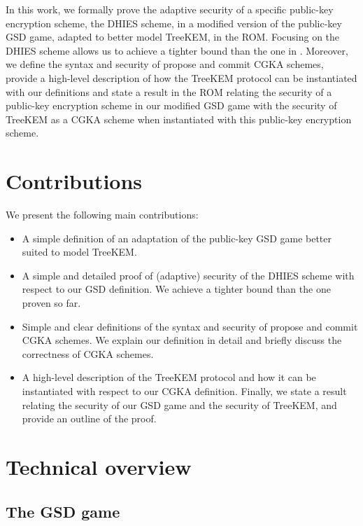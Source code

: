 In this work, we formally prove the adaptive security of a specific public-key encryption scheme, the DHIES scheme, in a modified version of the public-key GSD game, adapted to better model TreeKEM, in the ROM. Focusing on the DHIES scheme allows us to achieve a tighter bound than the one in \cite{ttkem}. Moreover, we define the syntax and security of propose and commit CGKA schemes, provide a high-level description of how the TreeKEM protocol can be instantiated with our definitions and state a result in the ROM relating the security of a public-key encryption scheme in our modified GSD game with the security of TreeKEM as a CGKA scheme when instantiated with this public-key encryption scheme.

\section{Contributions}

We present the following main contributions:
\begin{itemize}
	\item A simple definition of an adaptation of the public-key GSD game better suited to model TreeKEM.
	\item A simple and detailed proof of (adaptive) security of the DHIES scheme with respect to our GSD definition. We achieve a tighter bound than the one proven so far.
	\item Simple and clear definitions of the syntax and security of propose and commit CGKA schemes. We explain our definition in detail and briefly discuss the correctness of CGKA schemes.
	\item A high-level description of the TreeKEM protocol and how it can be instantiated with respect to our CGKA definition. Finally, we state a result relating the security of our GSD game and the security of TreeKEM, and provide an outline of the proof.
\end{itemize}

\section{Technical overview}

\subsection{The GSD game}

